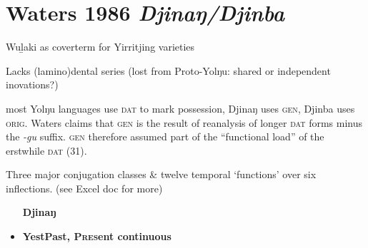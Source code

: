 \documentclass[10pt]{article}
\begin{document}
\section{Waters 1986 \textit{Djinaŋ/Djinba}}
	\begin{itemize}{\color{gray}
		\item Wuḻaki as coverterm for Yirritjing varieties
		\item Lacks (lamino)dental series (lost from Proto-Yolŋu: shared or independent inovations?)
		\ex {}\xe
		\item most Yolŋu languages use \textsc{dat} to mark possession, Djinaŋ uses \textsc{gen}, Djinba uses \textsc{orig}. Waters claims that \textsc{gen} is the result of reanalysis of longer \textsc{dat} forms minus the \textit{-gu} suffix. \textsc{gen} therefore assumed part of the ``functional load'' of the erstwhile \textsc{dat} (31).}
	\item Three major conjugation classes \& twelve temporal `functions' over six inflections. (see Excel doc for more)
		\begin{itemize}
			\item[\textbf{Djinaŋ}] 
			\item\textbf{ YestPast, \textsc{Pres}ent continuous}
			

\end{itemize}
\end{itemize}
\end{document}
